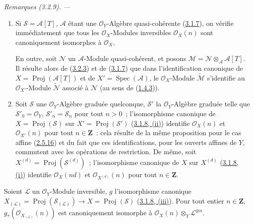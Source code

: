 \par\medskip\noindent\textit{Remarques (3.2.9). ---\ }
\label{II.3.2.9-fr}
\begin{enumerate}
  \item[\rm(i)] Si $\mathcal{S}=\mathcal{A}[T]$, $\mathcal{A}$ étant une
    $\mathcal{O}_Y$-Algèbre quasi-cohérente
    (\hyperref[II.3.1.7-fr]{3.1.7}), on vérifie immédiatement que tous les
    $\mathcal{O}_X$-Modules inversibles $\mathcal{O}_X(n)$ sont canoniquement
    isomorphes à $\mathcal{O}_X$.

    En outre, soit $\mathcal{N}$ un $\mathcal{A}$-Module quasi-cohérent, et
    posons $\mathcal{M}=\mathcal{N}\otimes_{\mathcal{A}}\mathcal{A}[T]$. Il
    résulte alors de (\hyperref[II.3.2.3-fr]{3.2.3}) et de
    (\hyperref[II.3.1.7-fr]{3.1.7}) que dans l'identification canonique de
    $X=\operatorname{Proj}(\mathcal{A}[T])$ et de
    $X'=\operatorname{Spec}(\mathcal{A})$, le $\mathcal{O}_X$-Module
    $\widetilde{\mathcal{M}}$ s'identifie au $\mathcal{O}_{X'}$-Module
    $\widetilde{\mathcal{N}}$ associé à $\mathcal{N}$ (au sens de
    (\hyperref[II.1.4.3-fr]{1.4.3})).
  \item[\rm(ii)] Soit $\mathcal{S}$ une $\mathcal{O}_Y$-Algèbre graduée
    quelconque, $\mathcal{S}'$ la $\mathcal{O}_Y$-Algèbre graduée telle que
    $\mathcal{S}'_0=\mathcal{O}_Y$, $\mathcal{S}'_n=\mathcal{S}_n$ pour tout
    $n>0$~; l'isomorphisme canonique de
    $X=\operatorname{Proj}(\mathcal{S})$ sur
    $X'=\operatorname{Proj}(\mathcal{S}')$
    (\hyperref[II.3.1.8-fr]{3.1.8, (ii)}) identifie $\mathcal{O}_X(n)$ et
    $\mathcal{O}_{X'}(n)$ pour tout $n\in\mathbf{Z}$~: cela résulte de la même
    proposition pour le cas affine (\hyperref[II.2.5.16-fr]{2.5.16}) et du
    fait que ces identifications, pour les ouverts affines de $Y$, commutent
    avec les opérations de restriction. De même, soit
    $X^{(d)}=\operatorname{Proj}(\mathcal{S}^{(d)})$~; l'isomorphisme
    canonique de $X$ sur $X^{(d)}$
    (\hyperref[II.3.1.8-fr]{3.1.8, (i)}) identifie $\mathcal{O}_X(nd)$ et
    $\mathcal{O}_{X^{(d)}}(n)$ pour tout $n\in\mathbf{Z}$.
\end{enumerate}

\begin{proposition}[3.2.10]
\label{II.3.2.10-fr}
Soient $\mathcal{L}$ un $\mathcal{O}_Y$-Module inversible, $g$ l'isomorphisme
canonique
$X_{(\mathcal{L})}=\operatorname{Proj}(\mathcal{S}_{(\mathcal{L})})
\to X=\operatorname{Proj}(\mathcal{S})$
(\hyperref[II.3.1.8-fr]{3.1.8, (iii)}). Pour tout entier $n\in\mathbf{Z}$,
$g_*(\mathcal{O}_{X_{(\mathcal{L})}}(n))$ est canoniquement isomorphe à
$\mathcal{O}_X(n)\otimes_Y\mathcal{L}^{\otimes n}$.
\end{proposition}

